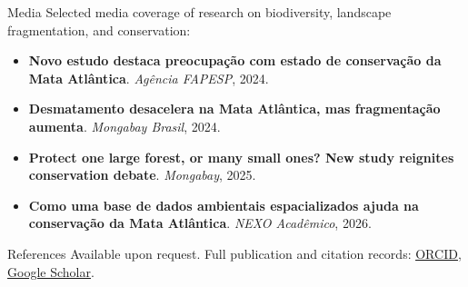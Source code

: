 \documentclass{resume}
\begin{document}
\begin{rSection}{Media}
Selected media coverage of research on biodiversity, landscape fragmentation, and conservation:
\begin{itemize}
\item \textbf{Novo estudo destaca preocupação com estado de conservação da Mata Atlântica}. \textit{Agência FAPESP}, 2024.
\item \textbf{Desmatamento desacelera na Mata Atlântica, mas fragmentação aumenta}. \textit{Mongabay Brasil}, 2024.
\item \textbf{Protect one large forest, or many small ones? New study reignites conservation debate}. \textit{Mongabay}, 2025.
\item \textbf{Como uma base de dados ambientais espacializados ajuda na conservação da Mata Atlântica}. \textit{NEXO Acadêmico}, 2026.
\end{itemize}
\end{rSection}

\begin{rSection}{References}
Available upon request. Full publication and citation records: \href{https://orcid.org/0000-0001-9650-7575}{\underline{ORCID}}, \href{https://scholar.google.com/citations?user=i-2xZBQAAAAJ}{\underline{Google Scholar}}.
\end{rSection}
\end{document}
